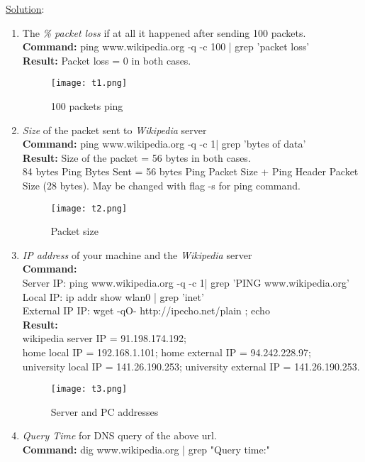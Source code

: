 \documentclass{WeSTassignment}
\begin{document}
\underline{Solution}: 
\begin{enumerate}
\itemsep0em
\item The \emph{\% packet loss} if at all it happened after sending 100 packets.
\\
\textbf{Command:} ping www.wikipedia.org -q -c 100 | grep 'packet loss'
\\
\textbf{Result:} Packet loss = 0 in both cases.
\begin{figure}[h]
  \centering
  \texttt{[image: t1.png]}
     \caption{100 packets ping}
     \label{fig:t1}
\end{figure}
\item \emph{Size} of the packet sent to \emph{Wikipedia} server
\\
\textbf{Command:} ping www.wikipedia.org -q -c 1| grep 'bytes of data'
\\
\textbf{Result:} Size of the packet = 56 bytes in both cases. \\ 84 bytes  Ping Bytes Sent = 56 bytes Ping Packet Size + Ping Header Packet Size (28 bytes). May be changed with flag -s for ping command.
\begin{figure}[h]
  \centering
  \texttt{[image: t2.png]}
     \caption{Packet size}
     \label{fig:t2}
\end{figure}
\item \emph{IP address} of your machine and the \emph{Wikipedia} server
\\
\textbf{Command:} \\Server IP: ping www.wikipedia.org -q -c 1| grep 'PING www.wikipedia.org'\\
Local IP: ip addr show wlan0 | grep 'inet'\\
External IP IP: wget -qO- http://ipecho.net/plain ; echo
\\
\textbf{Result:}\\   wikipedia server IP = 91.198.174.192;\\ home local IP = 192.168.1.101; home external IP = 94.242.228.97;\\ university local IP = 141.26.190.253; university external IP = 141.26.190.253.
\begin{figure}[h]
  \centering
  \texttt{[image: t3.png]}
     \caption{Server and PC addresses}
     \label{fig:t3}
\end{figure}
\item \emph{Query Time} for DNS query of the above url.
\\
\textbf{Command:} dig www.wikipedia.org | grep "Query time:"

\end{enumerate}
\end{document}
